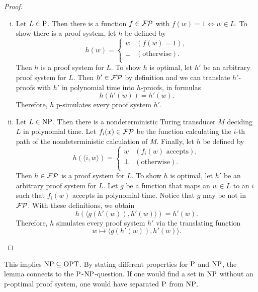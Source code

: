  \begin{proof}
    \begin{enumerate}[(i)]
      \item 
        Let \(L \in \P\). Then there is a function \(f \in \FP\) with \(f(w) = 1 \Leftrightarrow w \in L\). To show there is a proof system, let \(h\) be defined by
        \[
          h(w) =
          \begin{cases}
            w & (f(w) = 1), \\
            \perp & (\text{otherwise}). \\
          \end{cases}
        \]
        Then \(h\) is a proof system for \(L\). To show \(h\) is optimal, let \(h'\) be an arbitrary proof system for \(L\). Then \(h' \in \FP\) by definition and we can translate \(h'\)-proofs with \(h'\) in polynomial time into \(h\)-proofs, in formulas
        \[
          h(h'(w)) = h'(w).
        \]
        Therefore, \(h\) p-simulates every proof system \(h'\).
      \item
        Let \(L \in \NP\). Then there is a nondeterministic Turing transducer \(M\) deciding \(L\) in polynomial time. Let \(f_i(x) \in \FP\) be the function calculating the \(i\)-th path of the nondeterministic calculation of \(M\). Finally, let \(h\) be defined by
        \[
          h(\langle i, w \rangle) =
          \begin{cases}
            w & (f_i(w) \text{ accepts}), \\
            \perp & (\text{otherwise}). \\
          \end{cases}
        \]
        Then \(h \in \FP\) is a proof system for \(L\). To show \(h\) is optimal, let \(h'\) be an arbitrary proof system for \(L\). Let \(g\) be a function that maps an \(w \in L\) to an \(i\) such that \(f_i(w)\) accepts in polynomial time. Notice that \(g\) may be not in \(\FP\). With these definitions, we obtain
        \[
          h(\langle g(h'(w)), h'(w) \rangle) = h'(w).
        \]
        Therefore, \(h\) simulates every proof system \(h'\) via the translating function
          \[w \mapsto \langle g(h'(w)), h'(w) \rangle.\]
    \end{enumerate}
  \end{proof}

  This implies \(\NP \subseteq \OPT\). By stating different properties for \(\P\) and \(\NP\), the lemma connects to the \(\P\)-\(\NP\)-question. If one would find a set in \(\NP\) without an p-optimal proof system, one would have separated \(\P\) from \(\NP\).

